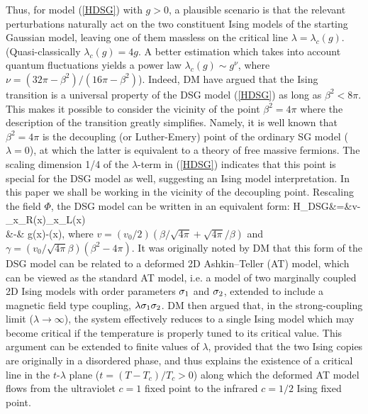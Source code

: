 Thus, for model (\ref{HDSG}) with $g > 0$,
a plausible scenario is that
the relevant perturbations 
naturally act on the two constituent 
Ising models of the starting Gaussian model,
leaving one of them massless on the
critical line $\lambda=\lambda_c(g)$.
(Quasi-classically $\lambda_c(g)=4g$. A better estimation which takes into
account quantum fluctuations yields a power law $\lambda_c(g) \sim g^{\nu}$,
where $\nu = \left(32\pi - \beta^2 \right)/\left(16\pi - \beta^2 \right)$).
Indeed,
DM have argued that the Ising transition is a
universal property of the DSG model (\ref{HDSG}) as long as $\beta^2 < 8\pi$.
This makes it possible to consider the vicinity of the point
$\beta^2 = 4\pi$ where the description of the transition greatly simplifies.
Namely,
it is well known\cite{Coleman,LE} that $\beta^2 = 4\pi$ is the decoupling
(or Luther-Emery) point of the ordinary SG model ($\lambda = 0$),
at which the latter is equivalent to a theory of free massive fermions.
The scaling dimension 1/4 of the $\lambda$-term in (\ref{HDSG}) indicates
that this point is special for the DSG model as well, suggesting 
an Ising model interpretation. In this paper we shall be working in 
the vicinity of the decoupling point. Rescaling the field $\Phi$,
the DSG model can be written in an equivalent form:
\bea
{\cal H}_{DSG}&=&v
-\gamma\p_x\phi_R(x)\p_x\phi_L(x)\nonumber\\&-&
g\cos\sqrt{4\pi}\Phi(x)-\lambda\sin\sqrt{\pi}\Phi(x),
\label{HDSGbis}
\eea
where $v=(v_0/2)(\beta/\sqrt{4\pi}+\sqrt{4\pi}/\beta)$
and $\gamma=(v_0/\sqrt{4\pi}\beta)(\beta^2-4\pi)$.
It was originally noted by DM that this form of
the DSG model can be related to a deformed 2D Ashkin--Teller (AT)
model, which can be viewed as the standard  AT model, i.e.
a model of two marginally coupled 2D Ising models
with order parameters $\sigma_1$ and $\sigma_2$, extended to
include a magnetic field type coupling, $\lambda \sigma_1 \sigma_2$.
DM then argued that, in the strong-coupling limit
($\lambda \rightarrow \infty$), the system effectively reduces
to a single Ising model which may become critical if the
temperature is properly tuned to its critical value.
This argument can be extended to finite values of $\lambda$,
provided that the two Ising copies are originally
in a disordered phase, and thus explains the existence of a critical line
in the $t$-$\lambda$ plane ($t = (T - T_c)/T_c > 0$)
along which the deformed AT model flows from the ultraviolet
$c = 1$ fixed point to the infrared $c = 1/2$ Ising fixed point.

